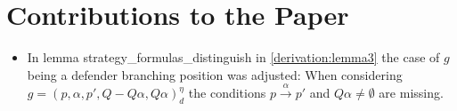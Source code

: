 \section{Contributions to the Paper}

\begin{itemize}
\item In lemma strategy_formulas_distinguish in \ref{derivation:lemma3} the case of $g$ being a defender branching position was adjusted: 
When considering $g=(p,\alpha ,p', Q- Q \alpha, Q \alpha)_d^\eta$ the conditions $p \overset{\alpha}{\longrightarrow} p'$ and $Q \alpha \neq \emptyset$ are 
missing. 
\end{itemize}